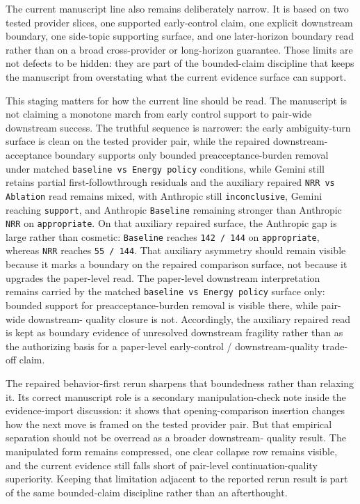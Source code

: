 \documentclass[11pt]{article}
\begin{document}
The current manuscript line also remains deliberately narrow. It is based on
two tested provider slices, one supported early-control claim, one explicit
downstream boundary, one side-topic supporting surface, and one later-horizon
boundary read rather than on a broad cross-provider or long-horizon guarantee.
Those limits are not defects to be hidden: they are part of the bounded-claim
discipline that keeps the manuscript from overstating what the current evidence
surface can support.

This staging matters for how the current line should be read. The manuscript is
not claiming a monotone march from early control support to pair-wide
downstream success. The truthful sequence is narrower: the early ambiguity-turn
surface is clean on the tested provider pair, while the repaired downstream-
acceptance boundary supports only bounded preacceptance-burden removal under
matched \texttt{baseline vs Energy policy} conditions, while Gemini still
retains partial first-followthrough residuals and the auxiliary repaired
\texttt{NRR vs Ablation} read remains mixed, with Anthropic still
\texttt{inconclusive}, Gemini reaching \texttt{support}, and Anthropic
\texttt{Baseline} remaining stronger than Anthropic \texttt{NRR} on
\texttt{appropriate}. On that auxiliary repaired surface, the Anthropic gap is
large rather than cosmetic: \texttt{Baseline} reaches \texttt{142 / 144} on
\texttt{appropriate}, whereas \texttt{NRR} reaches \texttt{55 / 144}. That
auxiliary asymmetry should remain visible because it marks a boundary on the
repaired comparison surface, not because it upgrades the paper-level read. The
paper-level downstream interpretation remains carried by the matched
\texttt{baseline vs Energy policy} surface only: bounded support for
preacceptance-burden removal is visible there, while pair-wide downstream-
quality closure is not. Accordingly, the auxiliary repaired read is kept as
boundary evidence of unresolved downstream fragility rather than as the
authorizing basis for a paper-level early-control / downstream-quality trade-off
claim.

The repaired behavior-first rerun sharpens that boundedness rather than
relaxing it. Its correct manuscript role is a secondary manipulation-check note
inside the evidence-import discussion: it shows that opening-comparison
insertion changes how the next move is framed on the tested provider pair. But
that empirical separation should not be overread as a broader downstream-
quality result. The manipulated form remains compressed, one clear collapse row
remains visible, and the current evidence still falls short of pair-level
continuation-quality superiority. Keeping that limitation adjacent to the
reported rerun result is part of the same bounded-claim discipline rather than
an afterthought.
\end{document}
